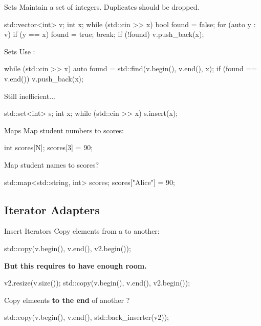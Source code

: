 \begin{frame}[fragile]{Sets}
    Maintain a set of integers. Duplicates should be dropped.
    \begin{cpp}
std::vector<int> v;
int x;
while (std::cin >> x) {
  bool found = false;
  for (auto y : v)
    if (y == x) {
      found = true;
      break;
    }
  if (!found)
    v.push_back(x);
}
    \end{cpp}
\end{frame}

\begin{frame}[fragile]{Sets}
    Use :
    \begin{cpp}
while (std::cin >> x) {
  auto found = std::find(v.begin(), v.end(), x);
  if (found == v.end())
    v.push_back(x);
}
    \end{cpp}
    Still inefficient...
    \pause
    \begin{cpp}
std::set<int> s;
int x;
while (std::cin >> x)
  s.insert(x);
    \end{cpp}
\end{frame}

\begin{frame}[fragile]{Maps}
    Map student numbers to scores:
    \begin{cpp}
int scores[N];
scores[3] = 90;
    \end{cpp}
    Map student names to scores?
    \pause
    \begin{cpp}
std::map<std::string, int> scores;
scores["Alice"] = 90;
    \end{cpp}
\end{frame}

\subsection{Iterator Adapters}

\begin{frame}[fragile]{Insert Iterators}
    Copy elements from a  to another:
    \begin{cpp}
std::copy(v.begin(), v.end(), v2.begin());
    \end{cpp}
    \textbf{But this requires  to have enough room.}
    \pause
    \begin{cpp}
v2.resize(v.size());
std::copy(v.begin(), v.end(), v2.begin());
    \end{cpp}
    \pause
    Copy elmeents \textbf{to the end} of another ?
    \pause
    \begin{cpp}
std::copy(v.begin(), v.end(), std::back_inserter(v2));
    \end{cpp}
\end{frame}

